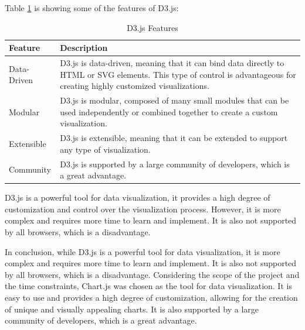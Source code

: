 Table \ref{tab:d3-js-features} is showing some of the features of D3.js\cite{d3}:

\begin{table}[H]
    \centering

    \begin{tabularx}{\textwidth}{|l|X|}
        \hline
        \textbf{Feature} & \textbf{Description}                                                                                                                                                      \\
        \hline
        Data-Driven      & D3.js is data-driven, meaning that it can bind data directly to HTML or SVG elements. This type of control is advantageous for creating highly customized visualizations. \\
        \hline
        Modular          & D3.js is modular, composed of many small modules that can be used independently or combined together to create a custom visualization.                                    \\
        \hline
        Extensible       & D3.js is extensible, meaning that it can be extended to support any type of visualization.                                                                                \\
        \hline
        Community        & D3.js is supported by a large community of developers, which is a great advantage.                                                                                        \\
        \hline
    \end{tabularx}
    \label{tab:d3-js-features}
    \caption{D3.js Features}
\end{table}


D3.js is a powerful tool for data visualization, it provides a high degree of customization and control over the visualization process. However, it is more complex and requires more time to learn and implement. It is also not supported by all browsers, which is a disadvantage.

In conclusion, while D3.js is a powerful tool for data visualization, it is more complex and requires more time to learn and implement. It is also not supported by all browsers, which is a disadvantage. Considering the scope of the project and the time constraints, Chart.js was chosen as the tool for data visualization. It is easy to use and provides a high degree of customization, allowing for the creation of unique and visually appealing charts. It is also supported by a large community of developers, which is a great advantage.

